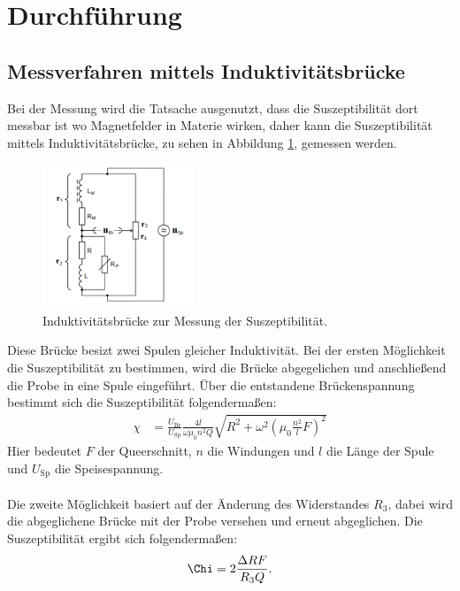 \newpage
\section{Durchführung}
\label{sec:Durchführung}
\subsection{Messverfahren mittels Induktivitätsbrücke}
Bei der Messung wird die Tatsache ausgenutzt, dass die Suszeptibilität dort messbar ist wo Magnetfelder in Materie
wirken, daher kann die Suszeptibilität mittels Induktivitätsbrücke,
zu sehen in Abbildung \ref{fig:brücke}, gemessen werden.
\begin{figure}
  \centering
  \includegraphics[width=0.4\textwidth]{bruecke.PNG}
  \caption{Induktivitätsbrücke zur Messung der Suszeptibilität. \cite{sample}}
  \label{fig:brücke}
\end{figure}
Diese Brücke besizt zwei Spulen gleicher Induktivität.
Bei der ersten Möglichkeit die Suszeptibilität zu bestimmen, wird die Brücke abgegelichen und anschließend die Probe in eine Spule eingeführt.
Über die entstandene Brückenspannung bestimmt sich die Suszeptibilität folgendermaßen:
\begin{align}
  \chi&=\frac{U_\mathrm{Br}}{U_\mathrm{Sp}}\frac{4l}{\omega\mu_0n^2Q}\sqrt{R^2 + \omega^2\left(\mu_0\frac{n^2}{l}F\right)^2}\label{eqn:chi1}
\end{align}
Hier bedeutet $F$ der Queerschnitt, $n$ die Windungen und $l$ die Länge der Spule und $U_\mathrm{Sp}$ die Speisespannung.\\
\\
Die zweite Möglichkeit basiert auf der Änderung des Widerstandes $R_3$, dabei wird die abgeglichene Brücke mit der Probe versehen
und erneut abgeglichen. Die Suszeptibilität ergibt sich folgendermaßen:
\begin{align}
\Chi=2\frac{\Delta R F}{R_\mathrm{3} Q}.\label{eqn:chi2}
\end{align}



